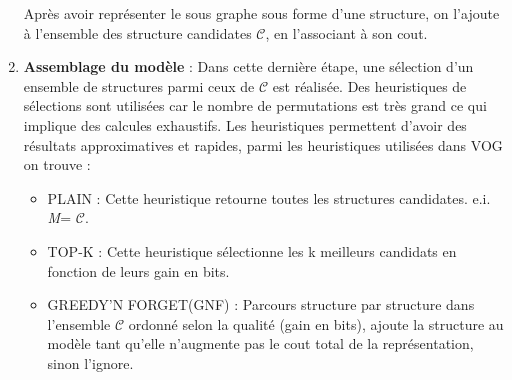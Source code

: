 \begin{enumerate}
  
Après avoir représenter le sous graphe sous forme d'une structure, on l'ajoute à l'ensemble des structure candidates $\mathcal{C}$, en l'associant à son cout.

\item \textbf{Assemblage du modèle }: Dans cette dernière étape, une sélection d'un ensemble de structures parmi ceux de $\mathcal{C}$ est réalisée. Des heuristiques de sélections sont utilisées car le nombre de permutations est très grand ce qui implique des calcules exhaustifs. Les heuristiques permettent d'avoir des résultats approximatives et rapides, parmi les heuristiques utilisées dans VOG on trouve :
\begin{itemize}
\item PLAIN : Cette heuristique retourne toutes les structures candidates. e.i. \textit{M}= $\mathcal{C}$.
\item TOP-K :  Cette heuristique sélectionne les k meilleurs candidats en fonction de leurs gain en bits.
\item GREEDY'N FORGET(GNF) : Parcours structure par structure dans l'ensemble $\mathcal{C}$ ordonné selon la qualité (gain en bits), ajoute la structure au modèle tant qu'elle n'augmente pas le cout total de la représentation, sinon l'ignore.
\end{itemize}  
\end{enumerate}







